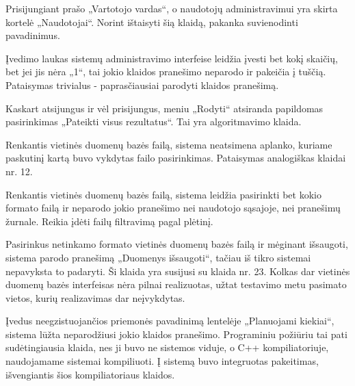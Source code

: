 {
  Prisijungiant prašo „Vartotojo vardas“, o naudotojų administravimui
  yra skirta kortelė „Naudotojai“.
}
{
  Norint ištaisyti šią klaidą, pakanka suvienodinti pavadinimus.
}

{
  Įvedimo laukas sistemų administravimo interfeise leidžia įvesti bet kokį skaičių, 
  bet jei jis nėra „1“, tai jokio klaidos pranešimo neparodo ir pakeičia į tuščią.
}
{
  Pataisymas trivialus - paprasčiausiai parodyti klaidos pranešimą.
}

{
  Kaskart atsijungus ir vėl prisijungus, meniu „Rodyti“ atsiranda papildomas
  pasirinkimas „Pateikti visus rezultatus“.
}
{
  Tai yra algoritmavimo klaida.
}

{
  Renkantis vietinės duomenų bazės failą, sistema neatsimena aplanko,
  kuriame paskutinį kartą buvo vykdytas failo pasirinkimas.
}
{
  Pataisymas analogiškas klaidai nr. 12.
}

{
  Renkantis vietinės duomenų bazės failą, sistema leidžia pasirinkti
  bet kokio formato failą ir neparodo jokio pranešimo nei naudotojo sąsajoje,
  nei pranešimų žurnale.
}
{
  Reikia įdėti failų filtravimą pagal plėtinį.
}

{
  Pasirinkus netinkamo formato vietinės duomenų bazės failą ir mėginant
  išsaugoti, sistema parodo pranešimą „Duomenys išsaugoti“, tačiau iš tikro sistemai
  nepavyksta to padaryti.
}
{
  Ši klaida yra susijusi su klaida nr. 23. Kolkas dar vietinės duomenų bazės
  interfeisas nėra pilnai realizuotas, užtat testavimo metu pasimato vietos,
  kurių realizavimas dar neįvykdytas.
}

{
  Įvedus neegzistuojančios priemonės pavadinimą lentelėje „Planuojami kiekiai“,
  sistema lūžta neparodžiusi jokio klaidos pranešimo.
}
{
  Programiniu požiūriu tai pati sudėtingiausia klaida, nes ji buvo ne sistemos viduje,
  o C++ kompiliatoriuje, naudojamame sistemai kompiliuoti. Į sistemą buvo integruotas
  pakeitimas, išvengiantis šios kompiliatoriaus klaidos.
}
